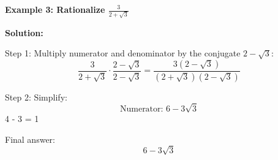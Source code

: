 \begin{flushleft}
\textbf{Example 3: Rationalize \(\frac{3}{2+\sqrt{3}}\)}

\textbf{Solution:} \vspace{0.2cm}

Step 1: Multiply numerator and denominator by the conjugate \(2 - \sqrt{3}\):  
\[
\frac{3}{2+\sqrt{3}} \cdot \frac{2 - \sqrt{3}}{2 - \sqrt{3}} = \frac{3(2 - \sqrt{3})}{(2+\sqrt{3})(2-\sqrt{3})}
\]

Step 2: Simplify:  
\[
\text{Numerator: } 6 - 3\sqrt{3} 
\]
 4 - 3 = 1
\[
\]

Final answer:  
\[
6 - 3\sqrt{3}
\]
\end{flushleft}

